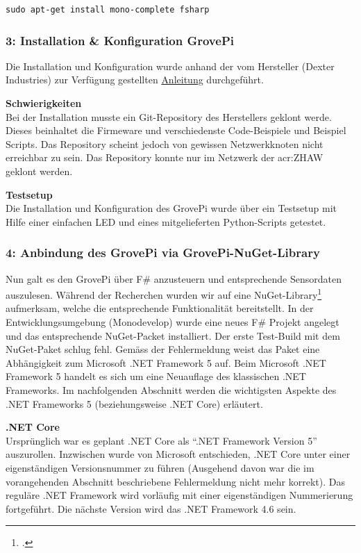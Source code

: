 \begin{lstlisting}
sudo apt-get install mono-complete fsharp
\end{lstlisting}


\subsubsection{3: Installation \& Konfiguration GrovePi}
Die Installation und Konfiguration wurde anhand der vom Hersteller (Dexter Industries) zur Verfügung gestellten \hyperlink{ http://www.dexterindustries.com/GrovePi/get-started-with-the-grovepi/setting-software/}{Anleitung} durchgeführt.

\textbf{Schwierigkeiten}\\
Bei der Installation musste ein Git-Repository des Herstellers geklont werde. Dieses beinhaltet die Firmeware und verschiedenste Code-Beispiele und Beispiel Scripts. Das Repository scheint jedoch von gewissen Netzwerkknoten nicht erreichbar zu sein. Das Repository konnte nur im Netzwerk der \gls{acr:ZHAW} geklont werden.

\textbf{Testsetup}\\
Die Installation und Konfiguration des GrovePi wurde über ein Testsetup mit Hilfe einer einfachen LED und eines mitgelieferten Python-Scripts getestet.


\subsubsection{4: Anbindung des GrovePi via GrovePi-NuGet-Library}
Nun galt es den GrovePi über F\# anzusteuern und entsprechende Sensordaten auszulesen. Während der Recherchen wurden wir auf eine NuGet-Library\footcite{NuGet_GrovePi_2016-04-24} aufmerksam, welche die entsprechende Funktionalität bereitstellt. In der Entwicklungsumgebung (Monodevelop) wurde eine neues F\# Projekt angelegt und das entsprechende NuGet-Packet installiert. Der erste Test-Build mit dem NuGet-Paket schlug fehl. Gemäss der Fehlermeldung weist das Paket eine Abhängigkeit zum Microsoft .NET Framework 5 auf. Beim Microsoft .NET Framework 5 handelt es sich um eine Neuauflage des klassischen .NET Frameworks. Im nachfolgenden Abschnitt werden die wichtigsten Aspekte des .NET Frameworks 5 (beziehungsweise .NET Core) erläutert.

\textbf{.NET Core}\\
Ursprünglich war es geplant .NET Core als "`.NET Framework Version 5"' auszurollen. Inzwischen wurde von Microsoft entschieden, .NET Core unter einer eigenständigen Versionsnummer zu führen (Ausgehend davon war die im vorangehenden Abschnitt beschriebene Fehlermeldung nicht mehr korrekt). Das reguläre .NET Framework wird vorläufig mit einer eigenständigen Nummerierung fortgeführt. Die nächste Version wird das .NET Framework 4.6 sein.

